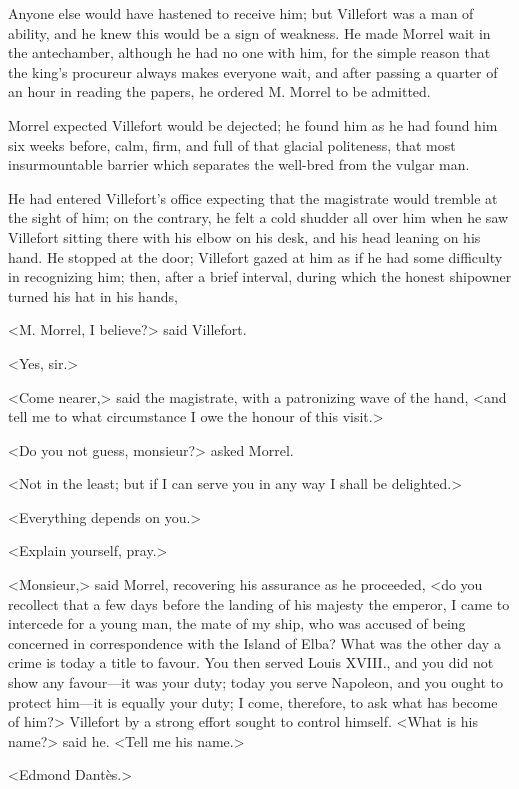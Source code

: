  Anyone else would have hastened to receive him; but Villefort was a man of ability, and he knew this would be a sign of weakness. He made Morrel wait in the antechamber, although he had no one with him, for the simple reason that the king's procureur always makes everyone wait, and after passing a quarter of an hour in reading the papers, he ordered M. Morrel to be admitted. 

 Morrel expected Villefort would be dejected; he found him as he had found him six weeks before, calm, firm, and full of that glacial politeness, that most insurmountable barrier which separates the well-bred from the vulgar man. 

 He had entered Villefort's office expecting that the magistrate would tremble at the sight of him; on the contrary, he felt a cold shudder all over him when he saw Villefort sitting there with his elbow on his desk, and his head leaning on his hand. He stopped at the door; Villefort gazed at him as if he had some difficulty in recognizing him; then, after a brief interval, during which the honest shipowner turned his hat in his hands, 

 <M. Morrel, I believe?> said Villefort. 

 <Yes, sir.> 

 <Come nearer,> said the magistrate, with a patronizing wave of the hand, <and tell me to what circumstance I owe the honour of this visit.> 

 <Do you not guess, monsieur?> asked Morrel. 

 <Not in the least; but if I can serve you in any way I shall be delighted.> 

 <Everything depends on you.> 

 <Explain yourself, pray.> 

 <Monsieur,> said Morrel, recovering his assurance as he proceeded, <do you recollect that a few days before the landing of his majesty the emperor, I came to intercede for a young man, the mate of my ship, who was accused of being concerned in correspondence with the Island of Elba? What was the other day a crime is today a title to favour. You then served Louis XVIII., and you did not show any favour—it was your duty; today you serve Napoleon, and you ought to protect him—it is equally your duty; I come, therefore, to ask what has become of him?>  Villefort by a strong effort sought to control himself. <What is his name?> said he. <Tell me his name.> 

 <Edmond Dantès.> 

